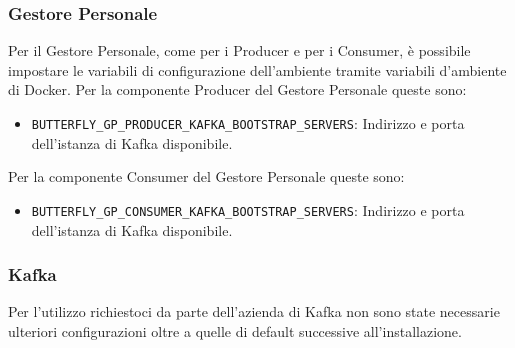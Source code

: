 	\subsubsection{Gestore Personale}
	Per il Gestore Personale, come per i Producer e per i Consumer, è possibile impostare le variabili di configurazione dell'ambiente tramite variabili d'ambiente di Docker.
	Per la componente Producer del Gestore Personale queste sono:
	\begin{itemize}
		\item\texttt{BUTTERFLY\_GP\_PRODUCER\_KAFKA\_BOOTSTRAP\_SERVERS}: Indirizzo e porta dell'istanza di Kafka disponibile.
	\end{itemize}

	Per la componente Consumer del Gestore Personale queste sono:
	\begin{itemize}
		\item\texttt{BUTTERFLY\_GP\_CONSUMER\_KAFKA\_BOOTSTRAP\_SERVERS}: Indirizzo e porta dell'istanza di Kafka disponibile.
	\end{itemize}

	
	\subsubsection{Kafka}
	Per l'utilizzo richiestoci da parte dell'azienda di Kafka non sono state necessarie ulteriori configurazioni oltre a quelle di default successive all'installazione.
	